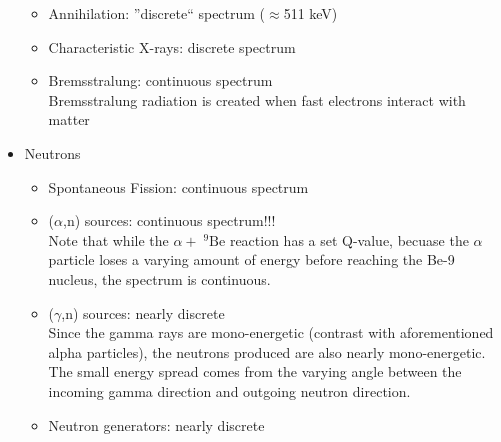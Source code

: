 \begin{itemize}
\begin{itemize}
        \item Annihilation: ''discrete`` spectrum ($\approx$511 keV)
        \item Characteristic X-rays: discrete spectrum  
        \item Bremsstralung: continuous spectrum\\
        Bremsstralung radiation is created when fast electrons interact with matter
    \end{itemize}
    \item Neutrons
    \begin{itemize}
        \item Spontaneous Fission: continuous spectrum
        \item ($\alpha$,n) sources: continuous spectrum!!!\\
        Note that while the $\alpha+ \;^9\text{Be}$ reaction has a set Q-value, becuase the $\alpha$ particle loses a varying amount of energy before reaching the Be-9 nucleus, the spectrum is continuous.
        \item ($\gamma$,n) sources: nearly discrete\\
        Since the gamma rays are mono-energetic (contrast with aforementioned alpha particles), the neutrons produced are also nearly mono-energetic. The small energy spread comes from the varying angle between the incoming gamma direction and outgoing neutron direction. 
        \item Neutron generators: nearly discrete
    \end{itemize}
\end{itemize}
